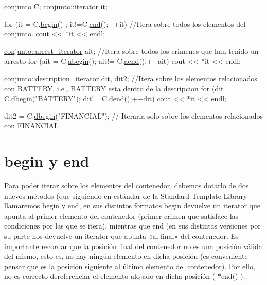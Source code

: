 \begin{DoxyCode}
\hyperlink{classconjunto}{conjunto} C;
\hyperlink{classconjunto_1_1iterator}{conjunto::iterator} it;

\textcolor{keywordflow}{for} (it = C.\hyperlink{classconjunto_af90b2324c2675dd4751a79f2e2ad8277}{begin}() ; it!=C.\hyperlink{classconjunto_adeef17ca21f1fb29f803790c89c1fc56}{end}();++it) \textcolor{comment}{//Itera sobre todos los elementos del conjunto.}
  cout << *it << endl;

\hyperlink{classconjunto_1_1arrest__iterator}{conjunto::arrest\_iterator} ait; \textcolor{comment}{//Itera sobre todos los crimenes que han tenido un
       arresto}
\textcolor{keywordflow}{for} (ait = C.\hyperlink{classconjunto_aae3e108ee38c624ca0a1f5e11fe7a1b0}{abegin}(); ait!= C.\hyperlink{classconjunto_a4464a19d9757c22306815d66749d072c}{aend}();++ait) 
  cout << *it << endl;


\hyperlink{classconjunto_1_1description__iterator}{conjunto::description\_iterator} dit, dit2;  \textcolor{comment}{//Itera sobre los elementos
       relacionados con BATTERY, i.e., BATTERY esta dentro de la descripcion}
\textcolor{keywordflow}{for} (dit = C.\hyperlink{classconjunto_a67554c4c219143b596ba82ec29508e93}{dbegin}(\textcolor{stringliteral}{"BATTERY"}); dit!= C.\hyperlink{classconjunto_af821d3bc50f2926a95aaa39a04c1ce7e}{dend}();++dit) 
  cout << *it << endl;

dit2 = C.\hyperlink{classconjunto_a67554c4c219143b596ba82ec29508e93}{dbegin}(\textcolor{stringliteral}{"FINANCIAL"});  \textcolor{comment}{// Iteraria solo sobre los elementos relacionados con FINANCIAL}
\end{DoxyCode}
\hypertarget{index_ini}{}\section{begin y end}\label{index_ini}
Para poder iterar sobre los elementos del contenedor, debemos dotarlo de dos nuevos métodos (que siguiendo en estándar de la Standard Template Library llamaremos begin y end, en sus distintos formatos begin devuelve un iterator que apunta al primer elemento del contenedor (primer crimen que satisface las condiciones por las que se itera), mientras que end (en sus distintas versiones por su parte nos devuelve un iterator que apunta «al final» del contenedor. Es importante recordar que la posición final del contenedor no es una posición válida del mismo, esto es, no hay ningún elemento en dicha posición (es conveniente pensar que es la posición siguiente al último elemento del contenedor). Por ello, no es correcto dereferenciar el elemento alojado en dicha posición ( $\ast$end() ).

